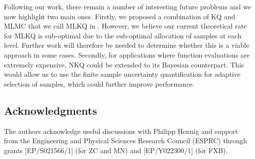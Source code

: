 Following our work, there remain a number of interesting future problems and we now highlight two main ones. Firstly, we proposed a combination of KQ and MLMC that we call MLKQ in . However, we believe our current theoretical rate for MLKQ is sub-optimal due to the sub-optimal allocation of samples at each level. Further work will therefore be needed to determine whether this is a viable approach in some cases.
Secondly, for applications where function evaluations are extremely expensive, NKQ could be extended to its Bayesian counterpart. This would allow us to use the finite sample uncertainty quantification for adaptive selection of samples, which could further improve performance.




 \subsection*{Acknowledgments}
 The authors acknowledge useful discussions with Philipp Hennig and support from the Engineering and Physical Sciences Research Council (ESPRC) through grants [EP/S021566/1] (for ZC and MN) and [EP/Y022300/1] (for FXB).



